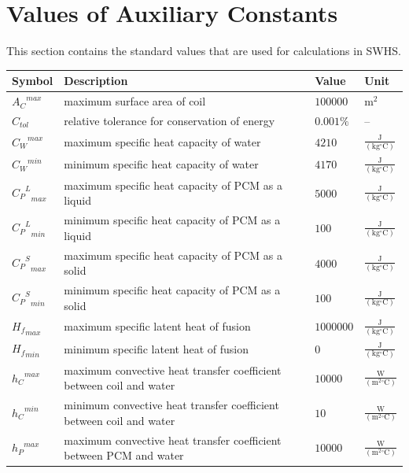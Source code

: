 \documentclass[12pt]{article}
\begin{document}
\section{Values of Auxiliary Constants}
\label{Sec:AuxConstants}
This section contains the standard values that are used for calculations in SWHS.
\begin{longtabu}{l X[l] l l}
\toprule
Symbol & Description & Value & Unit
\\
\midrule
\endhead
${{A_{C}}^{max}}$ & maximum surface area of coil & $100000$ & $\text{m}^{2}$
\\
${C_{tol}}$ & relative tolerance for conservation of energy & $0.001\%$ & --
\\
${{C_{W}}^{max}}$ & maximum specific heat capacity of water & $4210$ & $\frac{\text{J}}{(\text{kg}{}^{\circ}\text{C})}$
\\
${{C_{W}}^{min}}$ & minimum specific heat capacity of water & $4170$ & $\frac{\text{J}}{(\text{kg}{}^{\circ}\text{C})}$
\\
${{{C_{P}}^{L}}_{max}}$ & maximum specific heat capacity of PCM as a liquid & $5000$ & $\frac{\text{J}}{(\text{kg}{}^{\circ}\text{C})}$
\\
${{{C_{P}}^{L}}_{min}}$ & minimum specific heat capacity of PCM as a liquid & $100$ & $\frac{\text{J}}{(\text{kg}{}^{\circ}\text{C})}$
\\
${{{C_{P}}^{S}}_{max}}$ & maximum specific heat capacity of PCM as a solid & $4000$ & $\frac{\text{J}}{(\text{kg}{}^{\circ}\text{C})}$
\\
${{{C_{P}}^{S}}_{min}}$ & minimum specific heat capacity of PCM as a solid & $100$ & $\frac{\text{J}}{(\text{kg}{}^{\circ}\text{C})}$
\\
${{H_{f}}_{max}}$ & maximum specific latent heat of fusion & $1000000$ & $\frac{\text{J}}{(\text{kg}{}^{\circ}\text{C})}$
\\
${{H_{f}}_{min}}$ & minimum specific latent heat of fusion & $0$ & $\frac{\text{J}}{(\text{kg}{}^{\circ}\text{C})}$
\\
${{h_{C}}^{max}}$ & maximum convective heat transfer coefficient between coil and water & $10000$ & $\frac{\text{W}}{(\text{m}^{2}{}^{\circ}\text{C})}$
\\
${{h_{C}}^{min}}$ & minimum convective heat transfer coefficient between coil and water & $10$ & $\frac{\text{W}}{(\text{m}^{2}{}^{\circ}\text{C})}$
\\
${{h_{P}}^{max}}$ & maximum convective heat transfer coefficient between PCM and water & $10000$ & $\frac{\text{W}}{(\text{m}^{2}{}^{\circ}\text{C})}$

\end{longtabu}
\end{document}
